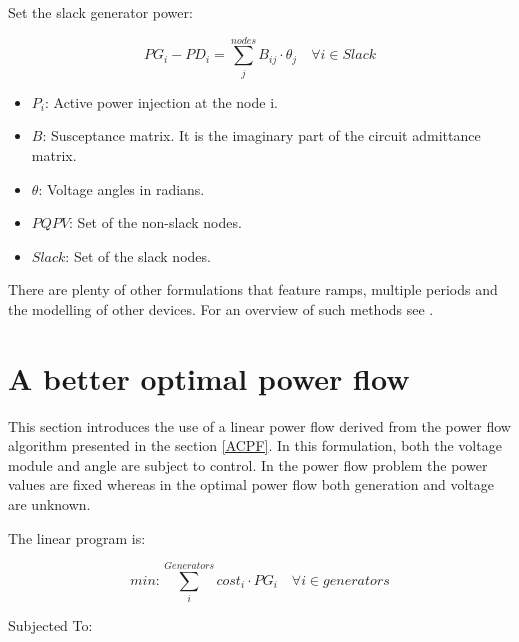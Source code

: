 \documentclass[nols,a4paper,twoside,notoc,fleqn]{tufte-book}
\begin{document}
Set the slack generator power:

\begin{equation}
PG_i - PD_i=\sum_j^{nodes} B_{ij} \cdot \theta_j  \quad  \forall i \in Slack
\end{equation}

\begin{itemize}
	\item $P_i$: Active power injection at the node i.
	\item $B$: Susceptance matrix. It is the imaginary part of the circuit admittance matrix.
	\item $\theta$: Voltage angles in radians.
	\item $PQPV$: Set of the non-slack nodes.
	
	\item $Slack$: Set of the slack nodes.
\end{itemize}

There are plenty of other formulations that feature ramps, multiple periods and the modelling of other devices.
For an overview of such methods see \cite{taylor2015convex}.

\newpage
\section{A better optimal power flow}

This section introduces the use of a linear power flow derived from the power flow algorithm presented in the section \ref{ACPF}. In this formulation, both the voltage module and angle are subject to control. In the power flow problem the power values are fixed whereas in the optimal power flow both generation and voltage are unknown.

The linear program is:

\begin{equation}
min: \sum_i^{Generators} cost_i \cdot PG_i   \quad \forall i \in generators
\end{equation}

Subjected To:
\end{document}

